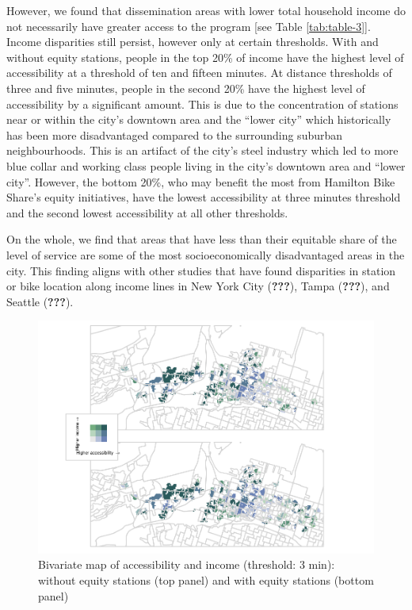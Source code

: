 \documentclass[]{elsarticle} %
\begin{document}
However, we found that dissemination areas with lower total household
income do not necessarily have greater access to the program {[}see
Table \ref{tab:table-3}{]}. Income disparities still persist, however
only at certain thresholds. With and without equity stations, people in
the top 20\% of income have the highest level of accessibility at a
threshold of ten and fifteen minutes. At distance thresholds of three
and five minutes, people in the second 20\% have the highest level of
accessibility by a significant amount. This is due to the concentration
of stations near or within the city's downtown area and the ``lower
city'' which historically has been more disadvantaged compared to the
surrounding suburban neighbourhoods. This is an artifact of the city's
steel industry which led to more blue collar and working class people
living in the city's downtown area and ``lower city''. However, the
bottom 20\%, who may benefit the most from Hamilton Bike Share's equity
initiatives, have the lowest accessibility at three minutes threshold
and the second lowest accessibility at all other thresholds.

On the whole, we find that areas that have less than their equitable
share of the level of service are some of the most socioeconomically
disadvantaged areas in the city. This finding aligns with other studies
that have found disparities in station or bike location along income
lines in New York City ({\textbf{???}}), Tampa ({\textbf{???}}), and
Seattle ({\textbf{???}}).

\begin{figure}
\includegraphics[width=1\linewidth]{Bike-share-spatial-equity_files/figure-latex/figure-bi-map-threshold-3-1} \caption{\label{fig-bivariate-map-threshold-3}Bivariate map of accessibility and income (threshold: 3 min): without equity stations (top panel) and with equity stations (bottom panel)}\label{fig:figure-bi-map-threshold-3}
\end{figure}
\end{document}
